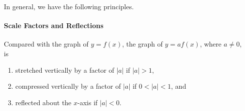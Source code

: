 \documentclass[10pt,]{book}
\theoremstyle{plain}
\theoremstyle{definition}
\theoremstyle{definition}
\theoremstyle{definition}
\theoremstyle{definition}
\theoremstyle{definition}
\numberwithin{equation}{section}
\newcommand\abs[1]{\left|#1\right|}
\newcommand{\lt}{ < }
\newcommand{\gt}{ > }
\begin{document}
    In general, we have the following principles.
%
\typeout{************************************************}
\typeout{************************************************}
\paragraph[Scale Factors and Reflections]{Scale Factors and Reflections}\label{paragraphs-29}
%
\par

    Compared with the graph of \(y = f (x)\), the graph of \(y = a f (x)\), where \(a \ne 0\), is
    \leavevmode%
\begin{enumerate}
\item\hypertarget{li-308}{}stretched vertically by a factor of \(\abs{a}\) if \(\abs{a}\gt 1\),\item\hypertarget{li-309}{}compressed vertically by a factor of \(\abs{a}\) if \(0\lt\abs{a}\lt 1\), and\item\hypertarget{li-310}{}reflected about the \(x\)-axis if \(\abs{a}\lt 0\).\end{enumerate}
\end{document}
